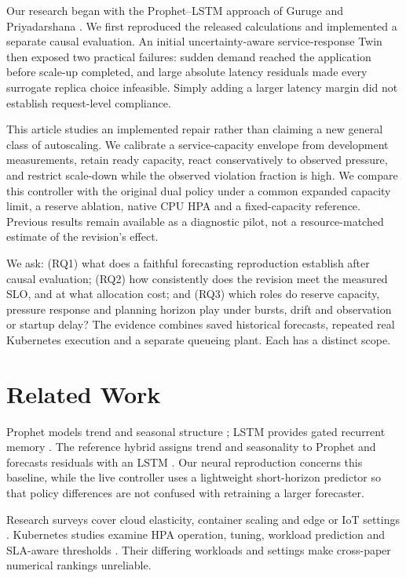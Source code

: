 \documentclass[10pt,twocolumn,a4paper]{article}
\begin{document}
Our research began with the Prophet--LSTM approach of Guruge and Priyadarshana \cite{guruge}. We first reproduced the released calculations and implemented a separate causal evaluation. An initial uncertainty-aware service-response Twin then exposed two practical failures: sudden demand reached the application before scale-up completed, and large absolute latency residuals made every surrogate replica choice infeasible. Simply adding a larger latency margin did not establish request-level compliance.

This article studies an implemented repair rather than claiming a new general class of autoscaling. We calibrate a service-capacity envelope from development measurements, retain ready capacity, react conservatively to observed pressure, and restrict scale-down while the observed violation fraction is high. We compare this controller with the original dual policy under a common expanded capacity limit, a reserve ablation, native CPU HPA and a fixed-capacity reference. Previous results remain available as a diagnostic pilot, not a resource-matched estimate of the revision's effect.

We ask: (RQ1) what does a faithful forecasting reproduction establish after causal evaluation; (RQ2) how consistently does the revision meet the measured SLO, and at what allocation cost; and (RQ3) which roles do reserve capacity, pressure response and planning horizon play under bursts, drift and observation or startup delay? The evidence combines saved historical forecasts, repeated real Kubernetes execution and a separate queueing plant. Each has a distinct scope.

\section{Related Work}
Prophet models trend and seasonal structure \cite{prophet}; LSTM provides gated recurrent memory \cite{lstm}. The reference hybrid assigns trend and seasonality to Prophet and forecasts residuals with an LSTM \cite{guruge}. Our neural reproduction concerns this baseline, while the live controller uses a lightweight short-horizon predictor so that policy differences are not confused with retraining a larger forecaster.

Research surveys cover cloud elasticity, container scaling and edge or IoT settings \cite{j06,j08,j09,j24,j26}. Kubernetes studies examine HPA operation, tuning, workload prediction and SLA-aware thresholds \cite{j01,j02,j03,j04}. Their differing workloads and settings make cross-paper numerical rankings unreliable.
\end{document}
